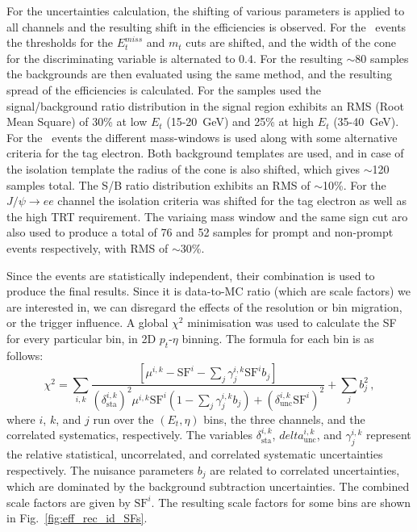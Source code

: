 For the uncertainties calculation, the shifting of various parameters is applied to all channels and the resulting shift in the efficiencies is observed. For the \Wenu\ events the thresholds for the $E_{t}^{miss}$ and $m_{t}$ cuts are shifted, and the width of the cone for the discriminating variable is alternated to $0.4$. For the resulting $\sim$80 samples the backgrounds are then evaluated using the same method, and the resulting spread of the efficiencies is calculated. For the samples used the signal/background ratio distribution in the signal region exhibits an RMS (Root Mean Square) of 30\% at low $E_{t}$ (15-20~GeV) and 25\% at high $E_{t}$ (35-40~GeV). For the \Zee\ events the different mass-windows is used along with some alternative criteria for the tag electron. Both background templates are used, and in case of the isolation template the radius of the cone is also shifted, which gives $\sim$120 samples total. The S/B ratio distribution exhibits an RMS of $\sim$10\%. For the $J/\psi \to ee$ channel the isolation criteria was shifted for the tag electron as well as the high TRT requirement. The variaing mass window and the same sign cut aro also used to produce a total of 76 and 52 samples for prompt and non-prompt events respectively, with RMS of $\sim$30\%.

Since the events are statistically independent, their combination is used to produce the final results. Since it is data-to-MC ratio (which are scale factors) we are interested in, we can disregard the effects of the resolution or bin migration, or the trigger influence. A global $\chi^{2}$ minimisation was used to calculate the SF for every particular bin, in 2D $p_{t}$-$\eta$ binning. The formula for each bin is as follows:
\begin{equation}
\chi^{2} = \sum_{i,k} \frac{\left[ \mu^{i,k} - \mathrm{SF}^{i} - \sum_{j} \gamma_{j}^{i,k}\mathrm{SF}^{i}b_{j} \right]}
  {\left( \delta^{i,k}_{\mathrm{sta}} \right)^{2} \mu^{i,k}\mathrm{SF}^{i} \left( 1 - \sum_{j} \gamma_{j}^{i,k}b_{j} \right) + \left(\delta^{i,k}_{\mathrm{unc}} \mathrm{SF}^{i} \right)^{2}}
  + \sum_{j} b_{j}^{2} \,,
\end{equation}
where $i$, $k$, and $j$ run  over  the  $(E_{t}, \eta)$ bins, the three channels, and the correlated systematics, respectively. The variables $\delta^{i,k}_{\mathrm{sta}}$, $delta^{i,k}_{\mathrm{unc}}$, and $\gamma_{j}^{i,k}$ represent the relative statistical, uncorrelated, and correlated systematic uncertainties respectively. The nuisance parameters $b_{j}$ are  related  to  correlated  uncertainties,  which are  dominated  by  the  background subtraction uncertainties. The combined scale factors are given by $\mathrm{SF}^{i}$. The resulting scale factors for some bins are shown in Fig.~\ref{fig:eff_rec_id_SFs}.

